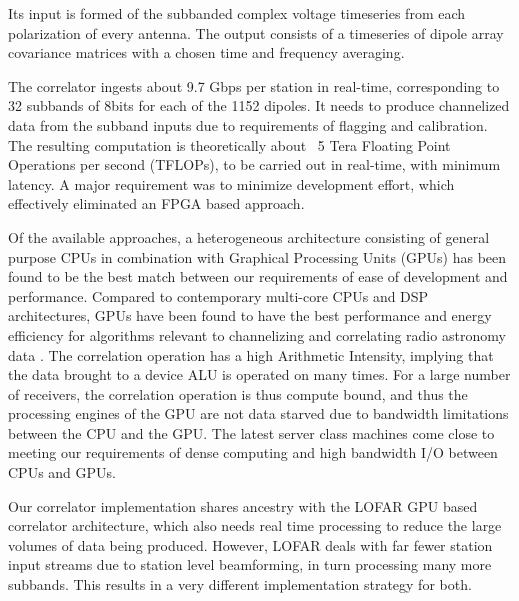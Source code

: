 \documentclass{ws-jai}
\begin{document}
Its  input is  formed  of the  subbanded complex  voltage  timeseries from  each
polarization of  every antenna.  The output  consists of a timeseries  of dipole
array covariance matrices with a chosen time and frequency averaging.

The correlator ingests about 9.7 Gbps per station in real-time, corresponding to
32  subbands of  8bits  for each  of  the  1152 dipoles.   It  needs to  produce
channelized data  from the subband  inputs due  to requirements of  flagging and
calibration. The resulting  computation is theoretically about  ~5 Tera Floating
Point  Operations per  second (TFLOPs),  to be  carried out  in real-time,  with
minimum latency.  A major requirement  was to minimize development effort, which
effectively eliminated an FPGA based approach.

Of the available  approaches, a heterogeneous architecture  consisting of general
purpose  CPUs in  combination with  Graphical Processing  Units (GPUs)  has been
found to be the  best match between our requirements of  ease of development and
performance.  Compared  to contemporary  multi-core CPUs and  DSP architectures,
GPUs have  been found  to have  the best performance  and energy  efficiency for
algorithms  relevant  to  channelizing  and  correlating  radio  astronomy  data
\cite{romein2016comparison}.  The  correlation operation  has a  high Arithmetic
Intensity, implying that  the data brought to  a device ALU is  operated on many
times.   For a  large number  of receivers,  the correlation  operation is  thus
compute bound, and thus  the processing engines of the GPU  are not data starved
due to  bandwidth limitations between  the CPU and  the GPU.  The  latest server
class machines  come close to  meeting our  requirements of dense  computing and
high bandwidth I/O between CPUs and GPUs.

Our  correlator  implementation  shares  ancestry   with  the  LOFAR  GPU  based
correlator architecture,  which also  needs real time  processing to  reduce the
large  volumes of  data being  produced.  However,  LOFAR deals  with far  fewer
station input streams due to station  level beamforming, in turn processing many
more  subbands. This  results in  a very  different implementation  strategy for
both.


\end{document}
